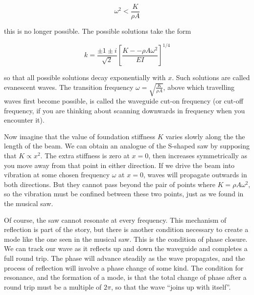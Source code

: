   $$\omega^2 < \frac{K}{\rho A} \tag{5}$$ 

  this is no longer possible. The possible solutions take the form 

  $$k=\frac{\pm 1 \pm i}{\sqrt{2}} \left[\dfrac{K -- \rho A \omega^2 }{EI} 
  \right]^{1/4} \tag{6}$$ 

  so that all possible solutions decay exponentially with $x$. Such solutions 
  are called evanescent waves. The transition frequency $\omega = 
  \sqrt{\frac{K}{\rho A} }$, above which travelling waves first become 
  possible, is called the waveguide cut-on frequency (or cut-off frequency, if 
  you are thinking about scanning downwards in frequency when you encounter 
  it). 

  Now imagine that the value of foundation stiffness $K$ varies slowly along 
  the the length of the beam. We can obtain an analogue of the S-shaped saw by 
  supposing that $K \propto x^2$. The extra stiffness is zero at $x=0$, then 
  increases symmetrically as you move away from that point in either direction. 
  If we drive the beam into vibration at some chosen frequency $\omega$ at 
  $x=0$, waves will propagate outwards in both directions. But they cannot pass 
  beyond the pair of points where $K=\rho A \omega^2$, so the vibration must be 
  confined between these two points, just as we found in the musical saw. 

  Of course, the saw cannot resonate at every frequency. This mechanism of 
  reflection is part of the story, but there is another condition necessary to 
  create a mode like the one seen in the musical saw. This is the condition of 
  phase closure. We can track our wave as it reflects up and down the waveguide 
  and completes a full round trip. The phase will advance steadily as the wave 
  propagates, and the process of reflection will involve a phase change of some 
  kind. The condition for resonance, and the formation of a mode, is that the 
  total change of phase after a round trip must be a multiple of $2 \pi$, so 
  that the wave ``joins up with itself''. 